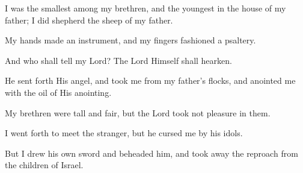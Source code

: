 I was the smallest among my brethren, and the youngest in the house of my father; I did shepherd the sheep of my father.

My hands made an instrument, and my fingers fashioned a psaltery.

And who shall tell my Lord? The Lord Himself shall hearken.

He sent forth His angel, and took me from my father’s flocks, and anointed me with the oil of His anointing.

My brethren were tall and fair, but the Lord took not pleasure in them.

I went forth to meet the stranger, but he cursed me by his idols.

But I drew his own sword and beheaded him, and took away the reproach from the children of Israel.
